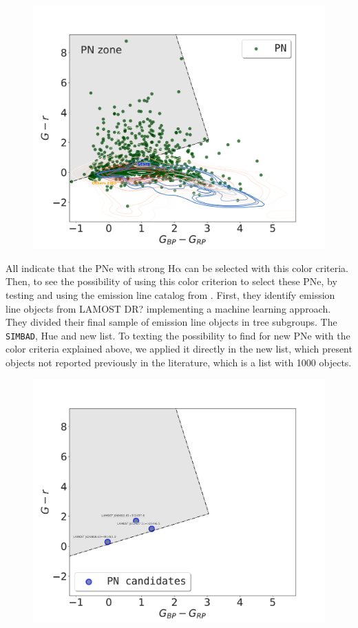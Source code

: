 \documentclass{article}
\newcommand\ha{\ensuremath{\mathrm{H\alpha}}}
\begin{document}
\begin{figure}
\centering
  \includegraphics[width=0.9\linewidth]{../Figs/color-diagram-ps-gaiaEDR3.pdf}
  \caption{} 
  \label{fig:gaia-ps}
\end{figure}

All indicate that the PNe with strong \ha{} can be selected with this color criteria.
Then, to see the possibility of using this color criterion to select these PNe, by
testing and using the emission line catalog from  \citet{Skoda:2020}. First, they
identify emission line objects from LAMOST DR? implementing a machine learning approach.
They divided their final sample of emission line objects in tree subgroups. The \texttt{SIMBAD},
Hue and new list. To texting the possibility to find for new PNe with the color criteria
explained above, we applied it directly in the new list, which present objects not reported
previously in the literature, which is a list with 1000 objects.

\begin{figure}
\centering
  \includegraphics[width=0.9\linewidth]{../Figs/pn-candidates-gaiaDR3.pdf}
  \caption{} 
  \label{fig:gaia-ps-apply}
\end{figure}
\end{document}
